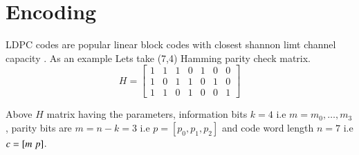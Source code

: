 \documentclass[journal,12pt,twocolumn]{IEEEtran}
\begin{document}
\section{Encoding}
 LDPC codes are popular linear block codes with closest shannon limt channel capacity \cite{ldpc}. As an example Lets take (7,4) Hamming parity check matrix.
 \begin{equation} \label{eq:H}
 H =  \begin{bmatrix} 
1 & 1 & 1 & 0 & 1 & 0 & 0 \\
1 & 0 & 1 & 1 & 0 & 1 & 0 \\
1 & 1 & 0 & 1 & 0 & 0 & 1 
\end{bmatrix}
 \end{equation}

Above $H$ matrix having the parameters, information bits $k=4$ i.e $m=m_0,\dots,m_3$ , parity bits are $m=n-k=3$ i.e $p=[p_0,p_1,p_2]$ and  code word length $n=7$ i.e $c=[m\hspace{1mm}p]$.
\end{document}
